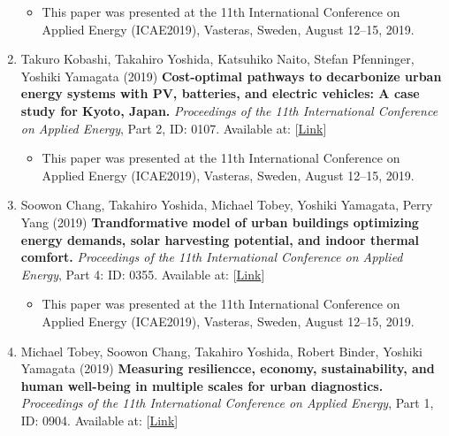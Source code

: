 \documentclass[]{book}
\providecommand{\tightlist}{%
  \setlength{\itemsep}{0pt}\setlength{\parskip}{0pt}}
\begin{document}
\begin{enumerate}
  \begin{itemize}
  \tightlist
  \item
    This paper was presented at the 11th International Conference on Applied Energy (ICAE2019), Vasteras, Sweden, August 12--15, 2019.
  \end{itemize}
\item
  Takuro Kobashi, Takahiro Yoshida, Katsuhiko Naito, Stefan Pfenninger, Yoshiki Yamagata (2019)
  \textbf{Cost-optimal pathways to decarbonize urban energy systems with PV, batteries, and electric vehicles: A case study for Kyoto, Japan.}
  \emph{Proceedings of the 11th International Conference on Applied Energy}, Part 2, ID: 0107.
  Available at: {[}\href{http://www.energy-proceedings.org/cost-optimal-pathways-to-decarbonize-urban-energy-systems-with-pv-batteries-and-electric-vehicles-a-case-study-for-kyoto-japan/}{Link}{]}

  \begin{itemize}
  \tightlist
  \item
    This paper was presented at the 11th International Conference on Applied Energy (ICAE2019), Vasteras, Sweden, August 12--15, 2019.
  \end{itemize}
\item
  Soowon Chang, Takahiro Yoshida, Michael Tobey, Yoshiki Yamagata, Perry Yang (2019)
  \textbf{Trandformative model of urban buildings optimizing energy demands, solar harvesting potential, and indoor thermal comfort.}
  \emph{Proceedings of the 11th International Conference on Applied Energy}, Part 4: ID: 0355.
  Available at: {[}\href{http://www.energy-proceedings.org/transformative-model-of-urban-buildings-optimizing-energy-demands-solar-harvesting-potential-and-indoor-thermal-comfort/}{Link}{]}

  \begin{itemize}
  \tightlist
  \item
    This paper was presented at the 11th International Conference on Applied Energy (ICAE2019), Vasteras, Sweden, August 12--15, 2019.
  \end{itemize}
\item
  Michael Tobey, Soowon Chang, Takahiro Yoshida, Robert Binder, Yoshiki Yamagata (2019)
  \textbf{Measuring resiliencce, economy, sustainability, and human well-being in multiple scales for urban diagnostics.}
  \emph{Proceedings of the 11th International Conference on Applied Energy}, Part 1, ID: 0904.
  Available at: {[}\href{http://www.energy-proceedings.org/measuring-resilience-economy-sustainability-and-human-wellbeing-in-multiple-scales-for-urban-diagnostics/}{Link}{]}


\end{enumerate}
\end{document}
